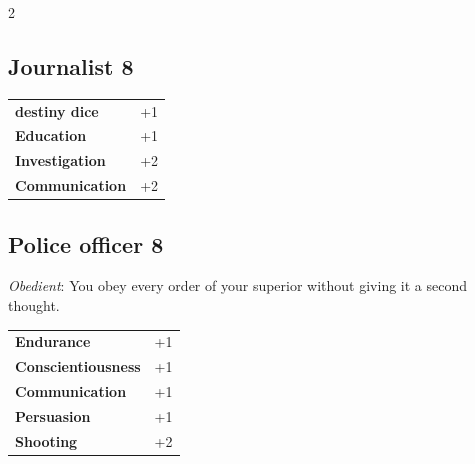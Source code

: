 \begin{multicols}{2}
\begin{tcolorbox}

\end{tcolorbox}

\begin{tcolorbox}
    \subsection*{Journalist \hfill \small{8 }}
    \tcblower




\begin{tabular}{@{}ll@{}}
    \textbf{destiny dice} & +1\\
    \textbf{Education} & +1\\
    \textbf{Investigation} & +2\\
    \textbf{Communication} & +2\\
\end{tabular}


\end{tcolorbox}

\begin{tcolorbox}
    \subsection*{Police officer \hfill \small{8 }}
    \tcblower
\textit{Obedient}: You obey every order of your superior without giving it a second thought.


\vspace{3mm}

\begin{tabular}{@{}ll@{}}
    \textbf{Endurance} & +1\\
    \textbf{Conscientiousness} & +1\\
    \textbf{Communication} & +1\\
    \textbf{Persuasion} & +1\\
    \textbf{Shooting} & +2\\
\end{tabular}


\end{tcolorbox}
\end{multicols}
